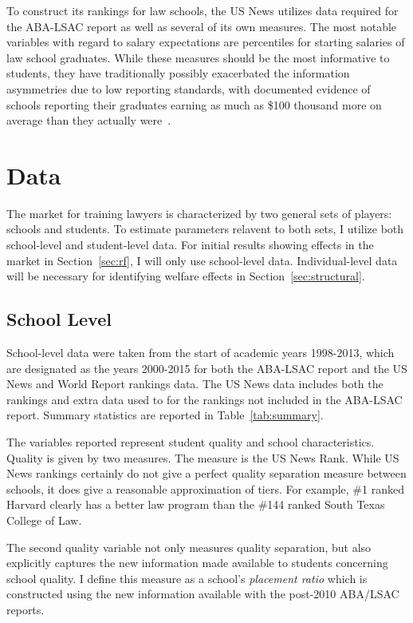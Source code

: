 \documentclass[12pt]{article}
\theoremstyle{definition}
\begin{document}
To construct its rankings for law schools, the US News utilizes data required for the ABA-LSAC report as well as several of its own measures. The most notable variables with regard to salary expectations are percentiles for starting salaries of law school graduates. While these measures should be the most informative to students, they have traditionally possibly exacerbated the information asymmetries due to low reporting standards, with documented evidence of schools reporting their graduates earning as much as \$100 thousand more on average than they actually were~\cite{Segal_econ}.

\section{Data}
\label{sec:data}
The market for training lawyers is characterized by two general sets of players: schools and students. To estimate parameters relavent to both sets, I utilize both school-level and student-level data. For initial results showing effects in the market in Section~\ref{sec:rf}, I will only use school-level data. Individual-level data will be necessary for identifying welfare effects in Section~\ref{sec:structural}.

\subsection{School Level}
\label{sec:data_school}
School-level data were taken from the start of academic years 1998-2013, which are designated as the years 2000-2015 for both the ABA-LSAC report and the US News and World Report rankings data. The US News data includes both the rankings and extra data used to for the rankings not included in the ABA-LSAC report. Summary statistics are reported in Table~\ref{tab:summary}. 

The variables reported represent student quality and school characteristics.  Quality is given by two measures. The measure is the US News Rank. While US News rankings certainly do not give a perfect quality separation measure between schools, it does give a reasonable approximation of tiers. For example, \#1 ranked Harvard clearly has a better law program than the \#144 ranked South Texas College of Law.

The second quality variable not only measures quality separation, but also explicitly captures the new information made available to students concerning school quality. I define this measure as a school's \emph{placement ratio} which is constructed using the new information available with the post-2010 ABA/LSAC reports.
\end{document}
